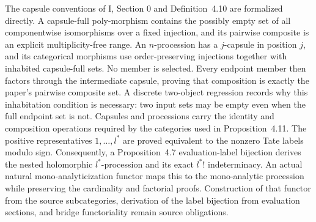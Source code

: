 \begin{definition}
  \label{def:source-processions}
  \leanok
  The capsule conventions of \IUT{} I, Section 0 and Definition~4.10 are
  formalized directly.  A capsule-full poly-morphism contains the possibly
  empty set of all componentwise isomorphisms over a fixed injection, and its
  pairwise composite is an explicit multiplicity-free range.  An
  \(n\)-procession has a \(j\)-capsule in position \(j\), and its categorical
  morphisms use order-preserving injections together with inhabited
  capsule-full sets.  No member is selected.  Every endpoint member then
  factors through the intermediate capsule, proving that composition is
  exactly the paper's pairwise composite set.  A discrete two-object
  regression records why this inhabitation condition is necessary: two input
  sets may be empty even when the full endpoint set is not.  Capsules and
  processions carry the identity and composition operations required by the
  categories used in Proposition~4.11.  The positive representatives
  \(1,\ldots,l^\ast\) are proved equivalent to the nonzero Tate labels modulo
  sign.  Consequently, a Proposition~4.7 evaluation-label bijection derives
  the nested holomorphic \(l^\ast\)-procession and its exact \(l^\ast!\)
  indeterminacy.  An actual natural mono-analyticization functor maps this to
  the mono-analytic procession while preserving the cardinality and factorial
  proofs.  Construction of that functor from the source subcategories,
  derivation of the label bijection from evaluation sections, and bridge
  functoriality remain source obligations.
\end{definition}

